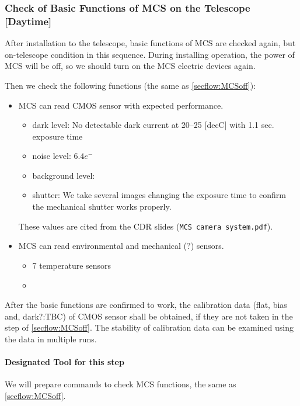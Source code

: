\subsubsection{Check of Basic Functions of MCS on the Telescope [Daytime]}\label{secflow:MCSon}


After installation to the telescope, basic functions of MCS are checked again, but on-telescope condition in this sequence.
During installing operation, the power of MCS will be off, so we should turn on the MCS electric devices again.

Then we check the following functions (the same as \ref{secflow:MCSoff}):

\begin{itemize}
\item MCS can read CMOS sensor with expected performance.
	\begin{itemize}
	\item dark level: No detectable dark current at 20--25 [decC] with 1.1 sec. exposure time
	\item noise level: $6.4 e^-$
	\item background level: 
	\item shutter: We take several images changing the exposure time to confirm the mechanical shutter works properly.
	\end{itemize}
These values are cited from the CDR slides ({\tt MCS camera system.pdf}).
\item MCS can read environmental and mechanical (?) sensors.
	\begin{itemize}
	\item 7 temperature sensors 
	\item {}
	\end{itemize}
\end{itemize}

After the basic functions are confirmed to work, the calibration data (flat, bias and, dark?:TBC) of CMOS sensor shall be obtained, if they are not taken in the step of \ref{secflow:MCSoff}.
The stability of calibration data can be examined using the data in multiple runs.

\paragraph{Designated Tool for this step}
We will prepare commands to check MCS functions, the same as \ref{secflow:MCSoff}.

